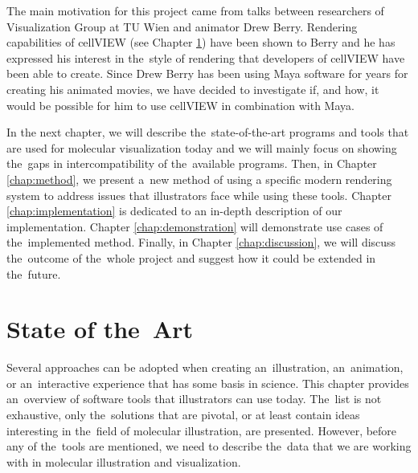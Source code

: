 \documentclass[
  digital, %
  table,   %
  nolof,     %
  nolot,     %
  oneside,
]{fithesis3}
\begin{document}

The main motivation for this project came from talks between researchers of Visualization Group at TU Wien and animator Drew Berry. Rendering capabilities of cellVIEW (see Chapter \ref{chap:star}) have been shown to Berry and he has expressed his interest in the style of rendering that developers of cellVIEW have been able to create. Since Drew Berry has been using Maya software for years for creating his animated movies, we have decided to investigate if, and how, it would be possible for him to use cellVIEW in combination with Maya.

In the next chapter, we will describe the state-of-the-art programs and tools that are used for molecular visualization today and we will mainly focus on showing the gaps in intercompatibility of the available programs.
Then, in Chapter \ref{chap:method}, we present a new method of using a specific modern rendering system to address issues that illustrators face while using these tools.
Chapter \ref{chap:implementation} is dedicated to an in-depth description of our implementation. Chapter \ref{chap:demonstration} will demonstrate use cases of the implemented method. Finally, in Chapter \ref{chap:discussion}, we will discuss the outcome of the whole project and suggest how it could be extended in the future.

\chapter{State of the Art}
\label{chap:star}
Several approaches can be adopted when creating an illustration, an animation, or an interactive experience that has some basis in science.
This chapter provides an overview of software tools that illustrators can use today. The list is not exhaustive, only the solutions that are pivotal, or at least contain ideas interesting in the field of molecular illustration, are presented.
However, before any of the tools are mentioned, we need to describe the data that we are working with in molecular illustration and visualization.
\end{document}
